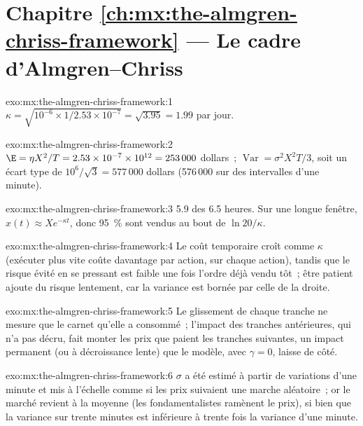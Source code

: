 \section*{Chapitre \ref{ch:mx:the-almgren-chriss-framework} --- Le cadre d'Almgren--Chriss}

\begin{solution}{exo:mx:the-almgren-chriss-framework:1}
$\kappa=\sqrt{10^{-6}\times1/2.53\times10^{-7}}=\sqrt{3.95}=1.99$ par jour.
\end{solution}

\begin{solution}{exo:mx:the-almgren-chriss-framework:2}
$\E=\eta X^2/T=2.53\times10^{-7}\times10^{12}=253\,000$ dollars~; $\operatorname{Var}=\sigma^2X^2T/3$, soit un écart type de $10^6/\sqrt3=577\,000$ dollars
(576\,000 sur des intervalles d'une minute).
\end{solution}

\begin{solution}{exo:mx:the-almgren-chriss-framework:3}
5.9 des 6.5 heures. Sur une longue fenêtre, $x(t)\approx Xe^{-\kappa t}$, donc 95~\% sont vendus au bout de $\ln20/\kappa$.
\end{solution}

\begin{solution}{exo:mx:the-almgren-chriss-framework:4}
Le coût temporaire croît comme $\kappa$ (exécuter plus vite coûte davantage par action, sur chaque action), tandis que le risque évité en se pressant est faible
une fois l'ordre déjà vendu tôt~; être patient ajoute du risque lentement, car la variance est bornée par celle de la droite.
\end{solution}

\begin{solution}{exo:mx:the-almgren-chriss-framework:5}
Le glissement de chaque tranche ne mesure que le carnet qu'elle a consommé~; l'impact des tranches antérieures, qui n'a pas décru, fait monter les prix que paient les tranches suivantes, un
impact permanent (ou à décroissance lente) que le modèle, avec $\gamma=0$, laisse de côté.
\end{solution}

\begin{solution}{exo:mx:the-almgren-chriss-framework:6}
$\sigma$ a été estimé à partir de variations d'une minute et mis à l'échelle comme si les prix suivaient une marche aléatoire~; or le marché revient à la moyenne (les fondamentalistes ramènent
le prix), si bien que la variance sur trente minutes est inférieure à trente fois la variance d'une minute.
\end{solution}

